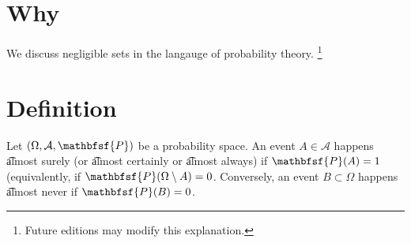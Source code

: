 
\section*{Why}

We discuss negligible sets in the langauge of probability theory.
    \ifhmode\unskip\fi\footnote{
Future editions may modify this explanation.
    }

\section*{Definition}

Let $(\Omega , \mathcal{A} , \mathbfsf{P} )$ be a probability space.
An event $A \in \mathcal{A} $ happens \t{almost surely} (or \t{almost certainly} or \t{almost always}) if $\mathbfsf{P} (A) = 1$ (equivalently, if $\mathbfsf{P} (\Omega  \setminus A) = 0$.
Conversely, an event $B \subset \Omega $ happens \t{almost never} if $\mathbfsf{P} (B) = 0$.

\blankpage